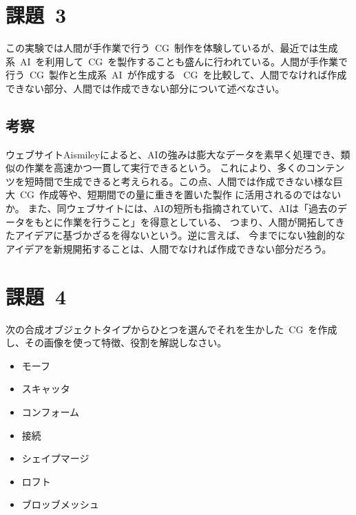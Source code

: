 \documentclass[a4j]{jarticle}
\begin{document}
\newpage
\section{課題\ 3}
この実験では人間が手作業で行う\ CG\ 制作を体験しているが、最近では生成系\ AI\ を利用して\ CG\ を製作することも盛んに行われている。人間が手作業で行う\ CG\ 製作と生成系\ AI\ が作成する
\ CG\ を比較して、人間でなければ作成できない部分、人間では作成できない部分について述べなさい。
\subsection{考察}
%
ウェブサイトAismileyによると、AIの強みは膨大なデータを素早く処理でき、類似の作業を高速かつ一貫して実行できるという\cite{Aismiley}。
これにより、多くのコンテンツを短時間で生成できると考えられる。この点、人間では作成できない様な巨大\ CG\ 作成等や、短期間での量に重きを置いた製作
に活用されるのではないか。 また、同ウェブサイトには、AIの短所も指摘されていて、AIは「過去のデータをもとに作業を行うこと」を得意としている、
つまり、人間が開拓してきたアイデアに基づかざるを得ないという\cite{Aismiley}。逆に言えば、
今までにない独創的なアイデアを新規開拓することは、人間でなければ作成できない部分だろう。
%

\newpage
\section{課題\ 4}
次の合成オブジェクトタイプからひとつを選んでそれを生かした\ CG\ を作成し、その画像を使って特徴、役割を解説しなさい。
\begin{itemize}
  \item[■] モーフ
  \item[■] スキャッタ
  \item[■] コンフォーム
  \item[■] 接続
  \item[■] シェイプマージ
  \item[■] ロフト
  \item[■] ブロッブメッシュ
\end{itemize}
\end{document}
